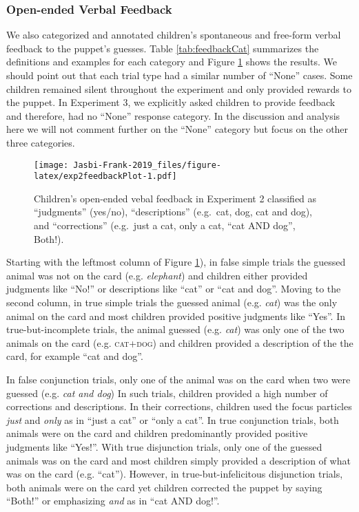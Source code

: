 \documentclass[,man,floatsintext]{apa6}
\begin{document}
\hypertarget{open-ended-verbal-feedback}{%
\subsubsection{Open-ended Verbal Feedback}\label{open-ended-verbal-feedback}}

We also categorized and annotated children's spontaneous and free-form verbal feedback to the puppet's guesses. Table \ref{tab:feedbackCat} summarizes the definitions and examples for each category and Figure \ref{fig:exp2feedbackPlot} shows the results. We should point out that each trial type had a similar number of \enquote{None} cases. Some children remained silent throughout the experiment and only provided rewards to the puppet. In Experiment 3, we explicitly asked children to provide feedback and therefore, had no \enquote{None} response category. In the discussion and analysis here we will not comment further on the \enquote{None} category but focus on the other three categories.

\begin{figure}
\centering
\texttt{[image: Jasbi-Frank-2019\_files/figure-latex/exp2feedbackPlot-1.pdf]}
\caption{\label{fig:exp2feedbackPlot}Children's open-ended vebal feedback in Experiment 2 classified as \enquote{judgments} (yes/no), \enquote{descriptions} (e.g.~cat, dog, cat and dog), and \enquote{corrections} (e.g.~just a cat, only a cat, \enquote{cat AND dog}, Both!).}
\end{figure}

Starting with the leftmost column of Figure \ref{fig:exp2feedbackPlot}), in false simple trials the guessed animal was not on the card (e.g. \emph{elephant}) and children either provided judgments like \enquote{No!} or descriptions like \enquote{cat} or \enquote{cat and dog}. Moving to the second column, in true simple trials the guessed animal (e.g. \emph{cat}) was the only animal on the card and most children provided positive judgments like \enquote{Yes}. In true-but-incomplete trials, the animal guessed (e.g. \emph{cat}) was only one of the two animals on the card (e.g. \textsc{cat+dog}) and children provided a description of the the card, for example \enquote{cat and dog}.

In false conjunction trials, only one of the animal was on the card when two were guessed (e.g. \emph{cat and dog}) In such trials, children provided a high number of corrections and descriptions. In their corrections, children used the focus particles \emph{just} and \emph{only} as in \enquote{just a cat} or \enquote{only a cat}. In true conjunction trials, both animals were on the card and children predominantly provided positive judgments like \enquote{Yes!}. With true disjunction trials, only one of the guessed animals was on the card and most children simply provided a description of what was on the card (e.g. \enquote{cat}). However, in true-but-infelicitous disjunction trials, both animals were on the card yet children corrected the puppet by saying \enquote{Both!} or emphasizing \emph{and} as in \enquote{cat AND dog!}.
\end{document}
